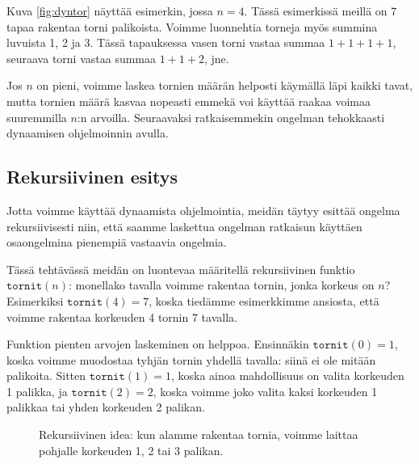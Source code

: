 Kuva \ref{fig:dyntor} näyttää esimerkin, jossa $n=4$.
Tässä esimerkissä meillä on 7 tapaa rakentaa torni palikoista.
Voimme luonnehtia torneja myös summina luvuista 1, 2 ja 3.
Tässä tapauksessa vasen torni vastaa summaa $1+1+1+1$,
seuraava torni vastaa summaa $1+1+2$, jne.

Jos $n$ on pieni, voimme laskea tornien määrän helposti
käymällä läpi kaikki tavat, mutta tornien määrä kasvaa
nopeasti emmekä voi käyttää raakaa voimaa suuremmilla
$n$:n arvoilla.
Seuraavaksi ratkaisemmekin ongelman tehokkaasti
dynaamisen ohjelmoinnin avulla.

\subsection{Rekursiivinen esitys}

Jotta voimme käyttää dynaamista ohjelmointia,
meidän täytyy esittää ongelma rekursiivisesti
niin, että saamme laskettua ongelman ratkaisun
käyttäen osaongelmina pienempiä vastaavia ongelmia.

Tässä tehtävässä meidän on luontevaa määritellä rekursiivinen
funktio $\texttt{tornit}(n)$: monellako tavalla voimme
rakentaa tornin, jonka korkeus on $n$?
Esimerkiksi $\texttt{tornit}(4)=7$, koska tiedämme
esimerkkimme ansiosta,
että voimme rakentaa korkeuden 4 tornin 7 tavalla.

Funktion pienten arvojen laskeminen on helppoa.
Ensinnäkin $\texttt{tornit}(0)=1$, koska voimme
muodostaa tyhjän tornin yhdellä tavalla:
siinä ei ole mitään palikoita.
Sitten $\texttt{tornit}(1)=1$, koska ainoa mahdollisuus
on valita korkeuden 1 palikka,
ja $\texttt{tornit}(2)=2$, koska voimme joko valita
kaksi korkeuden 1 palikkaa tai yhden korkeuden 2 palikan.

\begin{figure}
\center
{}
\caption{Rekursiivinen idea: kun alamme rakentaa tornia, voimme laittaa pohjalle
korkeuden 1, 2 tai 3 palikan.}
\label{fig:dynrek}
\end{figure}


